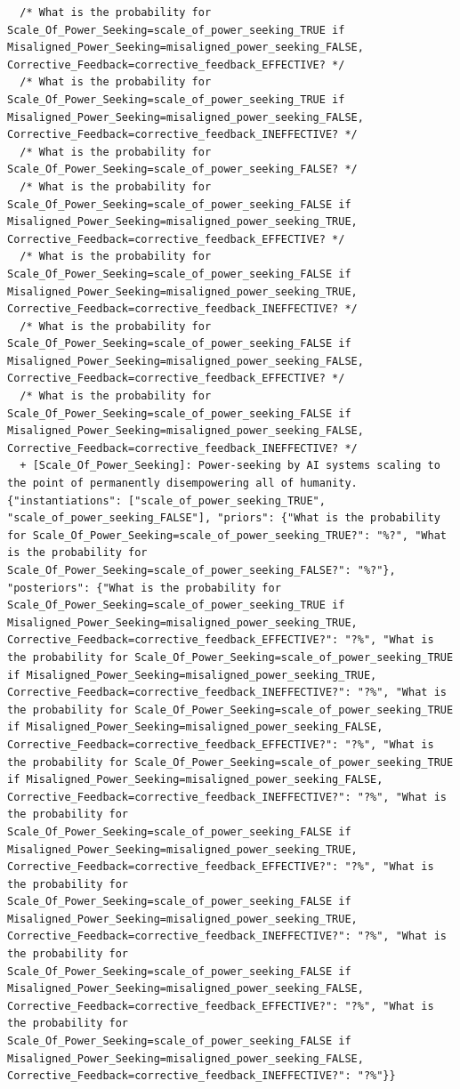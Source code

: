 \documentclass[
  11pt,
  letterpaper,
]{book}
\begin{document}
\begin{verbatim}
  /* What is the probability for Scale_Of_Power_Seeking=scale_of_power_seeking_TRUE if Misaligned_Power_Seeking=misaligned_power_seeking_FALSE, Corrective_Feedback=corrective_feedback_EFFECTIVE? */
  /* What is the probability for Scale_Of_Power_Seeking=scale_of_power_seeking_TRUE if Misaligned_Power_Seeking=misaligned_power_seeking_FALSE, Corrective_Feedback=corrective_feedback_INEFFECTIVE? */
  /* What is the probability for Scale_Of_Power_Seeking=scale_of_power_seeking_FALSE? */
  /* What is the probability for Scale_Of_Power_Seeking=scale_of_power_seeking_FALSE if Misaligned_Power_Seeking=misaligned_power_seeking_TRUE, Corrective_Feedback=corrective_feedback_EFFECTIVE? */
  /* What is the probability for Scale_Of_Power_Seeking=scale_of_power_seeking_FALSE if Misaligned_Power_Seeking=misaligned_power_seeking_TRUE, Corrective_Feedback=corrective_feedback_INEFFECTIVE? */
  /* What is the probability for Scale_Of_Power_Seeking=scale_of_power_seeking_FALSE if Misaligned_Power_Seeking=misaligned_power_seeking_FALSE, Corrective_Feedback=corrective_feedback_EFFECTIVE? */
  /* What is the probability for Scale_Of_Power_Seeking=scale_of_power_seeking_FALSE if Misaligned_Power_Seeking=misaligned_power_seeking_FALSE, Corrective_Feedback=corrective_feedback_INEFFECTIVE? */
  + [Scale_Of_Power_Seeking]: Power-seeking by AI systems scaling to the point of permanently disempowering all of humanity. {"instantiations": ["scale_of_power_seeking_TRUE", "scale_of_power_seeking_FALSE"], "priors": {"What is the probability for Scale_Of_Power_Seeking=scale_of_power_seeking_TRUE?": "%?", "What is the probability for Scale_Of_Power_Seeking=scale_of_power_seeking_FALSE?": "%?"}, "posteriors": {"What is the probability for Scale_Of_Power_Seeking=scale_of_power_seeking_TRUE if Misaligned_Power_Seeking=misaligned_power_seeking_TRUE, Corrective_Feedback=corrective_feedback_EFFECTIVE?": "?%", "What is the probability for Scale_Of_Power_Seeking=scale_of_power_seeking_TRUE if Misaligned_Power_Seeking=misaligned_power_seeking_TRUE, Corrective_Feedback=corrective_feedback_INEFFECTIVE?": "?%", "What is the probability for Scale_Of_Power_Seeking=scale_of_power_seeking_TRUE if Misaligned_Power_Seeking=misaligned_power_seeking_FALSE, Corrective_Feedback=corrective_feedback_EFFECTIVE?": "?%", "What is the probability for Scale_Of_Power_Seeking=scale_of_power_seeking_TRUE if Misaligned_Power_Seeking=misaligned_power_seeking_FALSE, Corrective_Feedback=corrective_feedback_INEFFECTIVE?": "?%", "What is the probability for Scale_Of_Power_Seeking=scale_of_power_seeking_FALSE if Misaligned_Power_Seeking=misaligned_power_seeking_TRUE, Corrective_Feedback=corrective_feedback_EFFECTIVE?": "?%", "What is the probability for Scale_Of_Power_Seeking=scale_of_power_seeking_FALSE if Misaligned_Power_Seeking=misaligned_power_seeking_TRUE, Corrective_Feedback=corrective_feedback_INEFFECTIVE?": "?%", "What is the probability for Scale_Of_Power_Seeking=scale_of_power_seeking_FALSE if Misaligned_Power_Seeking=misaligned_power_seeking_FALSE, Corrective_Feedback=corrective_feedback_EFFECTIVE?": "?%", "What is the probability for Scale_Of_Power_Seeking=scale_of_power_seeking_FALSE if Misaligned_Power_Seeking=misaligned_power_seeking_FALSE, Corrective_Feedback=corrective_feedback_INEFFECTIVE?": "?%"}}

\end{verbatim}
\end{document}
